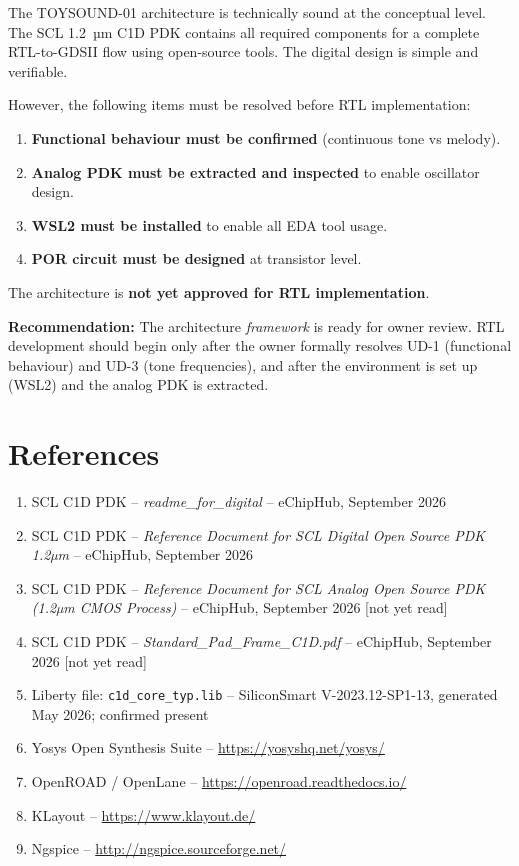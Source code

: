 \documentclass[11pt,a4paper]{article}
\begin{document}
The TOYSOUND-01 architecture is technically sound at the conceptual level. The SCL 1.2~µm C1D
PDK contains all required components for a complete RTL-to-GDSII flow using open-source tools.
The digital design is simple and verifiable.

However, the following items must be resolved before RTL implementation:

\begin{enumerate}
  \item \textbf{Functional behaviour must be confirmed} (continuous tone vs melody).
  \item \textbf{Analog PDK must be extracted and inspected} to enable oscillator design.
  \item \textbf{WSL2 must be installed} to enable all EDA tool usage.
  \item \textbf{POR circuit must be designed} at transistor level.
\end{enumerate}

The architecture is \textbf{not yet approved for RTL implementation}.

\textbf{Recommendation:} The architecture \emph{framework} is ready for owner review.
RTL development should begin only after the owner formally resolves UD-1 (functional behaviour)
and UD-3 (tone frequencies), and after the environment is set up (WSL2) and the analog PDK
is extracted.

\section{References}

\begin{enumerate}
  \item SCL C1D PDK -- \textit{readme\_for\_digital} -- eChipHub, September 2026
  \item SCL C1D PDK -- \textit{Reference Document for SCL Digital Open Source PDK 1.2µm} --
    eChipHub, September 2026
  \item SCL C1D PDK -- \textit{Reference Document for SCL Analog Open Source PDK (1.2µm CMOS
    Process)} -- eChipHub, September 2026 [not yet read]
  \item SCL C1D PDK -- \textit{Standard\_Pad\_Frame\_C1D.pdf} -- eChipHub, September 2026
    [not yet read]
  \item Liberty file: \texttt{c1d\_core\_typ.lib} -- SiliconSmart V-2023.12-SP1-13,
    generated May 2026; confirmed present
  \item Yosys Open Synthesis Suite -- \url{https://yosyshq.net/yosys/}
  \item OpenROAD / OpenLane -- \url{https://openroad.readthedocs.io/}
  \item KLayout -- \url{https://www.klayout.de/}
  \item Ngspice -- \url{http://ngspice.sourceforge.net/}
\end{enumerate}
\end{document}
